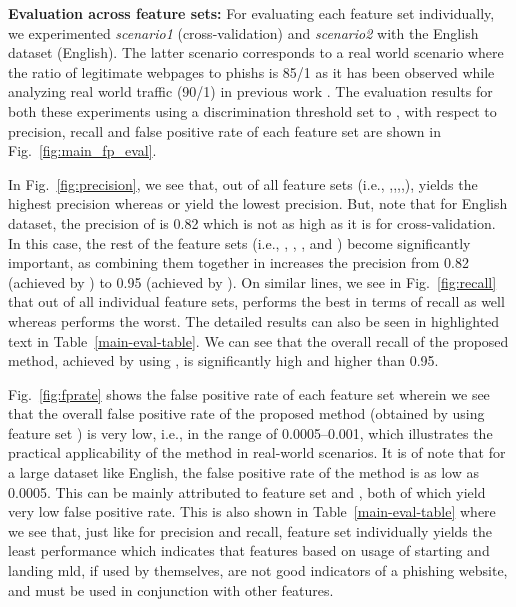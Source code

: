 \documentclass[10pt,conference,compsocconf,letterpaper]{IEEEtran}
\begin{document}
\iffullversion
\textbf{Evaluation across feature sets:} For evaluating each feature set individually, we experimented \textit{scenario1} (cross-validation) and \textit{scenario2} with the English dataset (English). The latter scenario corresponds to a real world scenario where the ratio of legitimate webpages to phishs is 85/1 as it has been observed while analyzing real world traffic (90/1) in previous work \cite{whittaker:2010:large}.
The  evaluation results for both these experiments using a discrimination threshold set to , with respect to precision, recall and false positive rate of each feature set are shown in Fig.~\ref{fig:main_fp_eval}.  

In Fig.~\ref{fig:precision}, we see that, out of all feature sets (i.e., ,,,,),  yields the highest precision whereas   or   yield the lowest precision. But, note that for English dataset, the precision of  is 0.82 which is not as high as it is for cross-validation. In this case, the rest of the feature sets (i.e., , , ,  and ) become significantly important, as combining them together in  increases the precision from 0.82 (achieved by ) to 0.95 (achieved by ).   
On similar lines, we see in Fig.~\ref{fig:recall} that out of  all individual feature sets,  performs the best in terms of recall as well whereas  performs the worst. 
The detailed results can also be seen in highlighted text in Table~\ref{main-eval-table}. We can see that the overall recall of  the proposed method, achieved by using , is significantly high and higher than 0.95.

Fig.~\ref{fig:fprate} shows the false positive rate of each feature set wherein we see that the overall false positive rate of the proposed method (obtained by using feature set ) is very low, i.e., in the range of 0.0005--0.001, which illustrates the practical applicability of the method in real-world scenarios. It is of note that for a large dataset like English, the false positive rate of the method is as low as 0.0005. This can be mainly attributed to feature set  and , both of which yield very low false positive rate. 
This is also shown in Table~\ref{main-eval-table} where we see that, just like for precision and recall, feature set  individually yields the least performance which indicates that features based on usage of starting and landing mld, if used by themselves, are not good indicators of a phishing website, and must be used in conjunction with other features.
\fi
\end{document}
